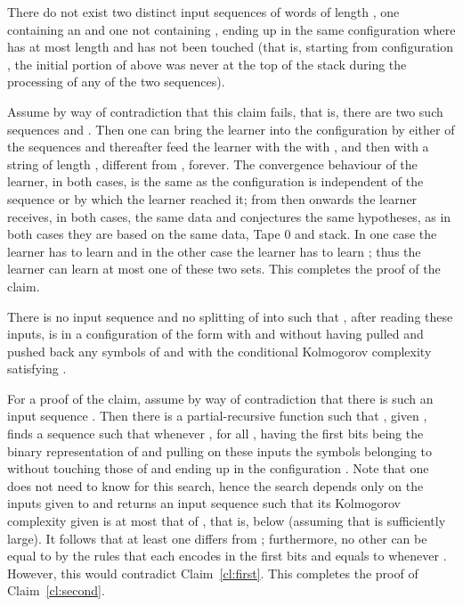\documentclass{LMCS}
\theoremstyle{plain}\newtheorem{athm}[thm]{Theorem}
\theoremstyle{plain}\newtheorem{aprop}[thm]{Proposition}
\theoremstyle{plain}\newtheorem{aprob}[thm]{Open Problem}
\theoremstyle{plain}\newtheorem{acor}[thm]{Corollary}
\theoremstyle{plain}\newtheorem{alem}[thm]{Lemma}
\theoremstyle{definition}\newtheorem{adefn}[thm]{Definition}
\theoremstyle{definition}\newtheorem{arem}[thm]{Remark}
\theoremstyle{plain}\newtheorem{aexmp}[thm]{Example}
\theoremstyle{plain}\newtheorem{aclm}[thm]{Claim}
\begin{document}
\begin{clm} \label{cl:first}
There do not exist two distinct input sequences of words of length
, one containing an  
and one not containing , ending up in the same configuration
 where  has at most length  and  has not been
touched (that is, starting from configuration , the
initial portion 
 of  above 
was never at the top of the stack during the processing of any of the
two sequences).
\end{clm}

\noindent
Assume by way of contradiction that this claim fails, that is, 
there are two such sequences  and . Then one can
bring the learner into the
configuration  by either of the sequences and thereafter feed
the learner with the  with , and then with a string 
of length , different from , forever.
The convergence
behaviour of the learner, in both cases, is the same as the configuration
 is independent of the sequence  or 
by which the learner reached it;
from then onwards the learner receives, in both cases, the same data and 
conjectures the same hypotheses, as in both cases they are based on 
the same data, Tape 0 and stack.
In one case the learner has to learn  and in
the other case the learner has to learn ; thus
the learner can learn at most one of these two sets.
This completes the proof of the claim.

\begin{clm} \label{cl:second}
There is no input sequence 
and no splitting of  into  such that , after reading these
inputs, is in a configuration of the form  with
 and without having pulled and pushed back any
symbols of  and with the conditional Kolmogorov complexity satisfying
.
\end{clm}

\noindent
For a proof of the claim,
assume by way of contradiction that there is such an input sequence 
.
Then there is a partial-recursive
function  such that , given 
, finds a sequence
 such that  whenever
,  for all ,  having
the first  bits being the binary representation of  and
 pulling on these inputs the symbols belonging to  without
touching those of  and ending up in the configuration .
Note that one does not need to know  for this search, hence the
search depends only on the inputs given to  and returns an input
sequence such that its Kolmogorov complexity 
given
 is at 
most that of , that
is, below  (assuming that  is sufficiently large).
It follows that at least one  differs from ;
furthermore, no other  can be equal to 
by the rules that each  encodes  in the
first  bits and equals to  whenever .
However, this would contradict Claim~\ref{cl:first}.
This completes the proof of
Claim~\ref{cl:second}.
\end{document}
